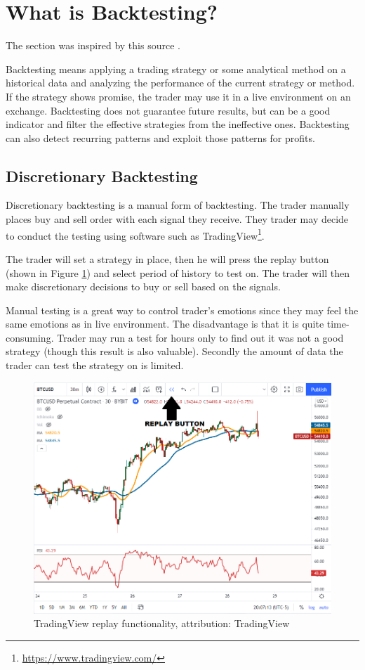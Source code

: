 \section{What is Backtesting?}
The section was inspired by this source \cite{backtesting-crypto-trading-strategies}.

Backtesting means applying a trading strategy or some analytical method on a historical data and analyzing the performance of the current strategy or method. If the strategy shows promise, the trader may use it in a live environment on an exchange. Backtesting does not guarantee future results, but can be a good indicator and filter the effective strategies from the ineffective ones. Backtesting can also detect recurring patterns and exploit those patterns for profits.

\subsection*{Discretionary Backtesting}
Discretionary backtesting is a manual form of backtesting. The trader manually places buy and sell order with each signal they receive. They trader may decide to conduct the testing using software such as TradingView\footnote{\url{https://www.tradingview.com/}}.

The trader will set a strategy in place, then he will press the replay button (shown in Figure \ref{tradingview-figure}) and select period of history to test on. The trader will then make discretionary decisions to buy or sell based on the signals.

Manual testing is a great way to control trader's emotions since they may feel the same emotions as in live environment. The disadvantage is that it is quite time-consuming. Trader may run a test for hours only to find out it was not a good strategy (though this result is also valuable). Secondly the amount of data the trader can test the strategy on is limited.

\begin{figure}[ht]
    \centering
    \includegraphics[width=\columnwidth]{figures/tradingview-replay.png}
    \caption{TradingView replay functionality, attribution: TradingView \cite{backtesting-crypto-trading-strategies}}
    \label{tradingview-figure}
\end{figure}

